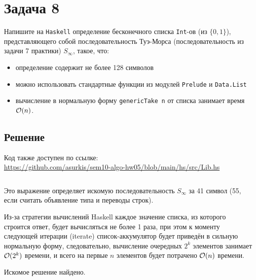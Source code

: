 \section{Задача 8}
Напишите на \texttt{Haskell} определение бесконечного списка
\texttt{Int}-ов (из $\{ 0, 1 \}$), представляющего собой последовательность
Туэ-Морса (последовательность из задачи 7 практики) $S_\infty$, такое, что:
\begin{itemize}
\item определение содержит не более 128 символов
\item можно использовать стандартные функции из модулей \texttt{Prelude} и \texttt{Data.List}
\item вычисление в нормальную форму \texttt{genericTake n} от списка занимает время $\mathcal{O}(n)$.
\end{itemize}

\subsection{Решение}
Код также доступен по ссылке:\\
\url{https://github.com/asurkis/sem10-algo-hw05/blob/main/hs/src/Lib.hs}

\inputminted{Haskell}{hs/src/Lib.hs}

Это выражение определяет искомую последовательность $S_\infty$ за 41 символ
(55, если считать объявление типа и переводы строк).

Из-за стратегии вычислений Haskell каждое значение списка, из которого строится ответ,
будет вычисляться не более 1 раза, при этом к моменту следующей итерации (iterate)
список-аккумулятор будет приведён в сильную нормальную форму,
следовательно, вычисление очередных $2^k$ элементов занимает $\mathcal{O}(2^k)$ времени,
и всего на первые $n$ элементов будет потрачено $\mathcal{O}(n)$ времени.

Искомое решение найдено.
